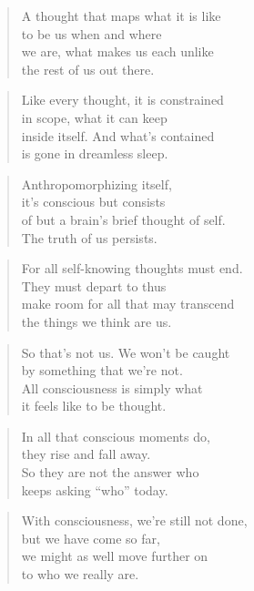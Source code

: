 \documentclass[14pt,a4paper]{article}
\begin{document}
\begin{verse}
A thought that maps what it is like\\
to be us when and where\\
we are, what makes us each unlike\\
the rest of us out there.
\end{verse}

\begin{verse}
Like every thought, it is constrained\\
in scope, what it can keep\\
inside itself. And what’s contained\\
is gone in dreamless sleep.
\end{verse}

\begin{verse}
Anthropomorphizing itself,\\
it’s conscious but consists\\
of but a brain’s brief thought of self.\\
The truth of us persists.
\end{verse}

\begin{verse}
For all self-knowing thoughts must end.\\
They must depart to thus\\
make room for all that may transcend\\
the things we think are us.
\end{verse}

\begin{verse}
So that’s not us. We won’t be caught\\
by something that we’re not.\\
All consciousness is simply what\\
it feels like to be thought.
\end{verse}

\begin{verse}
In all that conscious moments do,\\
they rise and fall away.\\
So they are not the answer who\\
keeps asking “who” today.
\end{verse}

\begin{verse}
With consciousness, we’re still not done,\\
but we have come so far,\\
we might as well move further on\\
to who we really are.
\end{verse}
\end{document}
